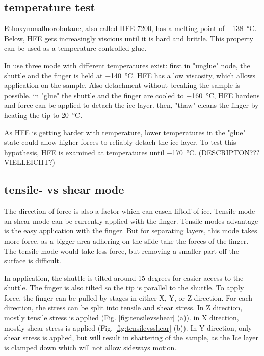 \subsection{temperature test}

Ethoxynonafluorobutane, also called HFE 7200, has a melting point of \SI{-138}{\degreeCelsius}. Below, HFE gets increasingly viscious until it is hard and brittle. This property can be used as a temperature controlled glue. 

In use three mode with different temperatures exist: first in "unglue" node, the shuttle and the finger is held at \SI{-140}{\degreeCelsius}. HFE has a low viscosity, which allows application on the sample. Also detachment without breaking the sample is possible. in "glue" the shuttle and the finger are cooled to \SI{-160}{\degreeCelsius}, HFE hardens and force can be applied to detach the ice layer. then, "thaw" cleans the finger by heating the tip to \SI{20}{\degreeCelsius}. 

As HFE is getting harder with temperature, lower temperatures in the "glue" state could allow higher forces to reliably detach the ice layer. To test this hypothesis, HFE is examined at temperatures until \SI{-170}{\degreeCelsius}. (DESCRIPTON??? VIELLEICHT?)

\subsection{tensile- vs shear mode}

The direction of force is also a factor which can easen liftoff of ice. Tensile mode an shear mode can be currently applied with the finger. Tensile modes advantage is the easy application with the finger. But for separating layers, this mode takes more force, as a bigger area adhering on the slide take the forces of the finger. The tensile mode would take less force, but removing a smaller part off the surface is difficult.

In application, the shuttle is tilted around 15 degrees for easier access to the shuttle. The finger is also tilted so the tip is parallel to the shuttle. To apply force, the finger can be pulled by stages in either X, Y, or Z direction. For each direction, the stress can be split into tensile and shear stress. In Z direction, mostly tensile stress is applied (Fig. \ref{fig:tensilevsshear} (a)). in X direction, mostly shear stress is applied (Fig. \ref{fig:tensilevsshear} (b)). In Y direction, only shear stress is applied, but will result in shattering of the sample, as the Ice layer is clamped down which will not allow sideways motion.




